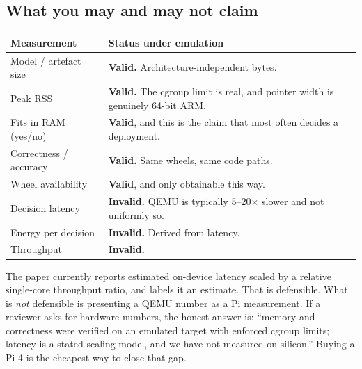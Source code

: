 \subsection{What you may and may not claim}

\begin{center}
\renewcommand{\arraystretch}{1.3}
\begin{tabular}{@{}>{\raggedright\arraybackslash}p{5.0cm}
                 >{\raggedright\arraybackslash}p{10.2cm}@{}}
\toprule
\rowcolor{conclavebg}
{\sffamily\bfseries\color{conclaveblue}Measurement} &
{\sffamily\bfseries\color{conclaveblue}Status under emulation} \\
\midrule
Model / artefact size & \textcolor{conclaveteal}{\textbf{Valid.}} Architecture-independent bytes. \\
Peak RSS & \textcolor{conclaveteal}{\textbf{Valid.}} The cgroup limit is real, and pointer width is genuinely 64-bit ARM. \\
Fits in RAM (yes/no) & \textcolor{conclaveteal}{\textbf{Valid}}, and this is the claim that most often decides a deployment. \\
Correctness / accuracy & \textcolor{conclaveteal}{\textbf{Valid.}} Same wheels, same code paths. \\
Wheel availability & \textcolor{conclaveteal}{\textbf{Valid}}, and only obtainable this way. \\
\midrule
Decision latency & \textcolor{conclavered}{\textbf{Invalid.}} QEMU is typically 5--20$\times$ slower and not uniformly so. \\
Energy per decision & \textcolor{conclavered}{\textbf{Invalid.}} Derived from latency. \\
Throughput & \textcolor{conclavered}{\textbf{Invalid.}} \\
\bottomrule
\end{tabular}
\end{center}

\begin{warnbox}
The paper currently reports estimated on-device latency scaled by a relative
single-core throughput ratio, and labels it an estimate. That is defensible.
What is \emph{not} defensible is presenting a QEMU number as a Pi measurement.
If a reviewer asks for hardware numbers, the honest answer is: ``memory and
correctness were verified on an emulated  target with enforced
cgroup limits; latency is a stated scaling model, and we have not measured on
silicon.'' Buying a Pi 4 is the cheapest way to close that gap.
\end{warnbox}

